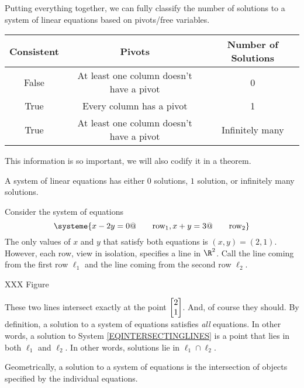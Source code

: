 	Putting everything together, we can fully classify the number of solutions to a system of linear equations
	based on pivots/free variables.

	\begin{center}
		\begin{tabular}{ccc}
			Consistent & Pivots & Number of Solutions\\
			\hline
			False & At least one column doesn't have a pivot & 0\\
			True & Every column has a pivot & 1\\
			True & At least one column doesn't have a pivot & Infinitely many\\
		\end{tabular}
	\end{center}

	This information is so important, we will also codify it in a theorem.

	\begin{theorem}
		A system of linear equations has either $0$ solutions, $1$ solution, or infinitely many solutions.
	\end{theorem}
	

	Consider the system of equations
	\begin{equation}
		\label{EQINTERSECTINGLINES}
		\systeme{
			x-2y=0@\qquad\text{row}_1,
			x+y=3@\qquad\text{row}_2
		}
	\end{equation}
	The only values of $x$ and $y$ that satisfy both equations is
	$(x,y)=(2,1)$. However, each row, view in isolation, specifies a line in $\R^2$. Call the line
	coming from the first row $\ell_1$ and the line coming from the second row $\ell_2$.

	XXX Figure

	These two lines intersect exactly at the point $\mat{2\\1}$. And, of course they should.
	By definition, a solution to a system of equations satisfies \emph{all} equations. In other words,
	a solution to System \eqref{EQINTERSECTINGLINES} is a point that lies in both $\ell_1$ and $\ell_2$.
	In other words, solutions lie in $\ell_1\cap \ell_2$.

	\begin{emphbox}[Takeaway]
		Geometrically, a solution to a system of equations is the intersection of objects specified
		by the individual equations.
	\end{emphbox}

